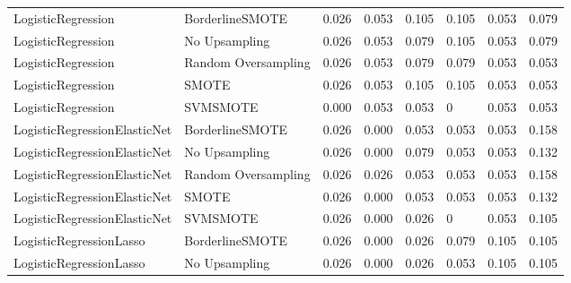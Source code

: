 \begin{tabular}{llllllll}
          LogisticRegression &     BorderlineSMOTE & 0.026 &                     0.053 &                 0.105 &                  0.105 &                                   0.053 &    0.079 \\
          LogisticRegression &       No Upsampling & 0.026 &                     0.053 &                 0.079 &                  0.105 &                                   0.053 &    0.079 \\
          LogisticRegression & Random Oversampling & 0.026 &                     0.053 &                 0.079 &                  0.079 &                                   0.053 &    0.053 \\
          LogisticRegression &               SMOTE & 0.026 &                     0.053 &                 0.105 &                  0.105 &                                   0.053 &    0.053 \\
          LogisticRegression &            SVMSMOTE & 0.000 &                     0.053 &                 0.053 &                      0 &                                   0.053 &    0.053 \\
LogisticRegressionElasticNet &     BorderlineSMOTE & 0.026 &                     0.000 &                 0.053 &                  0.053 &                                   0.053 &    0.158 \\
LogisticRegressionElasticNet &       No Upsampling & 0.026 &                     0.000 &                 0.079 &                  0.053 &                                   0.053 &    0.132 \\
LogisticRegressionElasticNet & Random Oversampling & 0.026 &                     0.026 &                 0.053 &                  0.053 &                                   0.053 &    0.158 \\
LogisticRegressionElasticNet &               SMOTE & 0.026 &                     0.000 &                 0.053 &                  0.053 &                                   0.053 &    0.132 \\
LogisticRegressionElasticNet &            SVMSMOTE & 0.026 &                     0.000 &                 0.026 &                      0 &                                   0.053 &    0.105 \\
     LogisticRegressionLasso &     BorderlineSMOTE & 0.026 &                     0.000 &                 0.026 &                  0.079 &                                   0.105 &    0.105 \\
     LogisticRegressionLasso &       No Upsampling & 0.026 &                     0.000 &                 0.026 &                  0.053 &                                   0.105 &    0.105 \\

\end{tabular}
